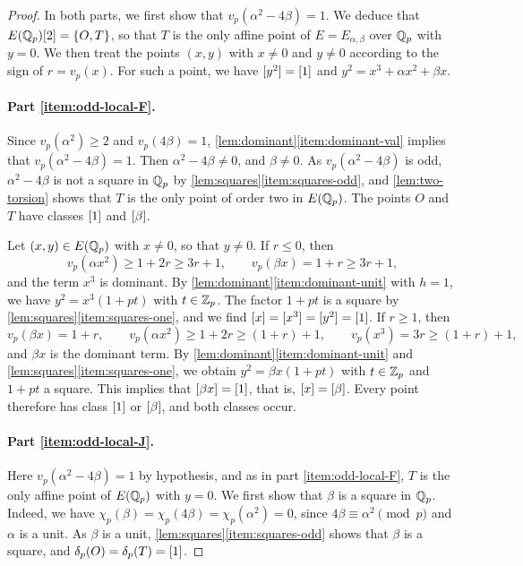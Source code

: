 \begin{proof}
In both parts, we first show that $v_p(\alpha^2-4\beta)=1$. We deduce that $E(\mathbb Q_p)[2]=\{O,T\}$, so that $T$ is the only affine point of $E=E_{\alpha,\beta}$ over $\mathbb Q_p$ with $y=0$. We then treat the points $(x,y)$ with $x\ne0$ and $y\ne0$ according to the sign of $r=v_p(x)$. For such a point, we have $[y^2]=[1]$ and $y^2=x^3+\alpha x^2+\beta x$.

\paragraph{Part \ref{item:odd-local-F}.} Since $v_p(\alpha^2)\ge2$ and $v_p(4\beta)=1$, \cref{lem:dominant}\ref{item:dominant-val} implies that $v_p(\alpha^2-4\beta)=1$. Then $\alpha^2-4\beta\ne0$, and $\beta\ne0$. As $v_p(\alpha^2-4\beta)$ is odd, $\alpha^2-4\beta$ is not a square in $\mathbb Q_p$ by \cref{lem:squares}\ref{item:squares-odd}, and \cref{lem:two-torsion} shows that $T$ is the only point of order two in $E(\mathbb Q_p)$. The points $O$ and $T$ have classes $[1]$ and $[\beta]$.

Let $(x,y)\in E(\mathbb Q_p)$ with $x\ne0$, so that $y\ne0$. If $r\le0$, then
\begin{equation}
v_p(\alpha x^2)\ge1+2r\ge3r+1,\qquad v_p(\beta x)=1+r\ge3r+1,
\end{equation}
and the term $x^3$ is dominant. By \cref{lem:dominant}\ref{item:dominant-unit} with $h=1$, we have $y^2=x^3(1+pt)$ with $t\in\mathbb Z_p$. The factor $1+pt$ is a square by \cref{lem:squares}\ref{item:squares-one}, and we find $[x]=[x^3]=[y^2]=[1]$. If $r\ge1$, then
\begin{equation}
v_p(\beta x)=1+r,\qquad v_p(\alpha x^2)\ge1+2r\ge(1+r)+1,\qquad v_p(x^3)=3r\ge(1+r)+1,
\end{equation}
and $\beta x$ is the dominant term. By \cref{lem:dominant}\ref{item:dominant-unit} and \cref{lem:squares}\ref{item:squares-one}, we obtain $y^2=\beta x(1+pt)$ with $t\in\mathbb Z_p$ and $1+pt$ a square. This implies that $[\beta x]=[1]$, that is, $[x]=[\beta]$. Every point therefore has class $[1]$ or $[\beta]$, and both classes occur.

\paragraph{Part \ref{item:odd-local-J}.} Here $v_p(\alpha^2-4\beta)=1$ by hypothesis, and as in part \ref{item:odd-local-F}, $T$ is the only affine point of $E(\mathbb Q_p)$ with $y=0$. We first show that $\beta$ is a square in $\mathbb Q_p$. Indeed, we have $\chi_p(\beta)=\chi_p(4\beta)=\chi_p(\alpha^2)=0$, since $4\beta\equiv\alpha^2\pmod p$ and $\alpha$ is a unit. As $\beta$ is a unit, \cref{lem:squares}\ref{item:squares-odd} shows that $\beta$ is a square, and $\delta_p(O)=\delta_p(T)=[1]$.


\end{proof}

